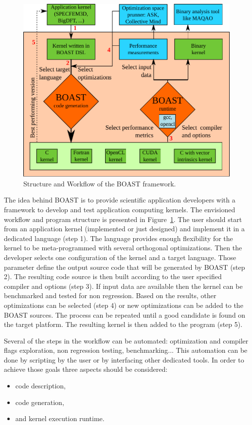 \documentclass[review]{elsarticle}
\begin{document}
\begin{figure}
\begin{center}
\includegraphics[width=\textwidth]{BOAST_Workflow.pdf}
\caption{Structure and Workflow of the BOAST framework.}
\label{fig:boast_workflow}
\end{center}
\end{figure}

  The idea behind BOAST is to provide scientific application developers with a
framework to develop and test application computing kernels. The envisioned
workflow and program structure is presented in Figure~\ref{fig:boast_workflow}.
The user should start from an application kernel (implemented or just designed)
and implement it in a dedicated language (step 1). The language provides enough
flexibility for the kernel to be meta-programmed with several orthogonal
optimizations. Then the developer selects one configuration of the kernel and a
target language. Those parameter define the output source code that will be
generated by BOAST (step 2). The resulting code source is then built according to
the user specified compiler and options (step 3). If input data are available
then the kernel can be benchmarked and tested for non regression. Based on the
results, other optimizations can be selected (step 4) or new optimizations can
be added to the BOAST sources. The process can be repeated until a good
candidate is found on the target platform. The resulting kernel is then added to
the program (step 5).

Several of the steps in the workflow can be automated: optimization and compiler
flags exploration, non regression testing, benchmarking... This automation can
be done by scripting by the user or by interfacing other dedicated tools. In
order to achieve those goals three aspects should be considered:
\begin{itemize}
\item code description,
\item code generation,
\item and kernel execution runtime.
\end{itemize}
\end{document}
